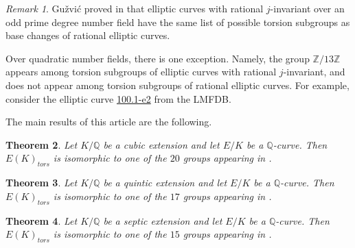 \documentclass[10pt,leqno]{amsart}
\newcommand{\Z}{\mathbb{Z}}
\newcommand{\Q}{\mathbb{Q}}
\newtheorem{theorem}{Theorem}[]
\theoremstyle{definition}
\theoremstyle{remark}
\newtheorem{remark}[theorem]{Remark}
\numberwithin{theorem}{section}
\begin{document}


\begin{remark}
    Gu\v{z}vi\'{c} proved in \cite[Theorem 5.1.2]{guzvic2021torsion} that elliptic curves with rational $j$-invariant over an odd prime degree number field have the same list of possible torsion subgroups as base changes of rational elliptic curves. 
    
    Over quadratic number fields, there is one exception. Namely, the group $\Z/13\Z$ appears among torsion subgroups of elliptic curves with rational $j$-invariant, and does not appear among torsion subgroups of rational elliptic curves. For example, consider the elliptic curve \hyperlink{https://www.lmfdb.org/EllipticCurve/2.2.17.1/100.1/e/2}{100.1-e2} from the LMFDB.
\end{remark}


The main results of this article are the following.


\begin{theorem}\label{mainresult}
        Let $K/\Q$ be a cubic extension and let $E/K$ be a $\Q$-curve. Then $E(K)_{tors}$ is isomorphic to one of the  $20$ groups appearing in .
\end{theorem}

\begin{theorem}\label{mainresult5}
    Let $K/\Q$ be a quintic extension and let $E/K$ be a $\Q$-curve. Then $E(K)_{tors}$ is isomorphic to one of the $17$ groups appearing in .
\end{theorem}

\begin{theorem}\label{mainresult7}
    Let $K/\Q$ be a septic extension and let $E/K$ be a $\Q$-curve. Then $E(K)_{tors}$ is isomorphic to one of the $15$ groups appearing in .
\end{theorem}
\end{document}
